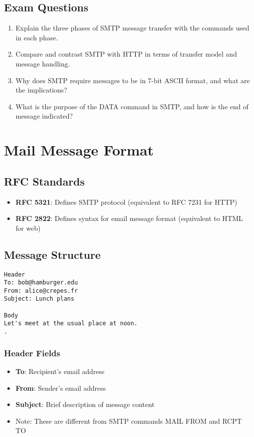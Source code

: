\documentclass[12pt]{article}
\begin{document}
\subsection{Exam Questions}
\begin{enumerate}
    \item Explain the three phases of SMTP message transfer with the commands used in each phase.
    \item Compare and contrast SMTP with HTTP in terms of transfer model and message handling.
    \item Why does SMTP require messages to be in 7-bit ASCII format, and what are the implications?
    \item What is the purpose of the DATA command in SMTP, and how is the end of message indicated?
\end{enumerate}

\section{Mail Message Format}

\subsection{RFC Standards}
\begin{itemize}
    \item \textbf{RFC 5321}: Defines SMTP protocol (equivalent to RFC 7231 for HTTP)
    \item \textbf{RFC 2822}: Defines syntax for email message format (equivalent to HTML for web)
\end{itemize}

\subsection{Message Structure}
\begin{verbatim}
Header
To: bob@hamburger.edu
From: alice@crepes.fr
Subject: Lunch plans

Body
Let's meet at the usual place at noon.
.
\end{verbatim}

\subsubsection{Header Fields}
\begin{itemize}
    \item \textbf{To}: Recipient's email address
    \item \textbf{From}: Sender's email address
    \item \textbf{Subject}: Brief description of message content
    \item Note: These are different from SMTP commands MAIL FROM and RCPT TO
\end{itemize}
\end{document}
